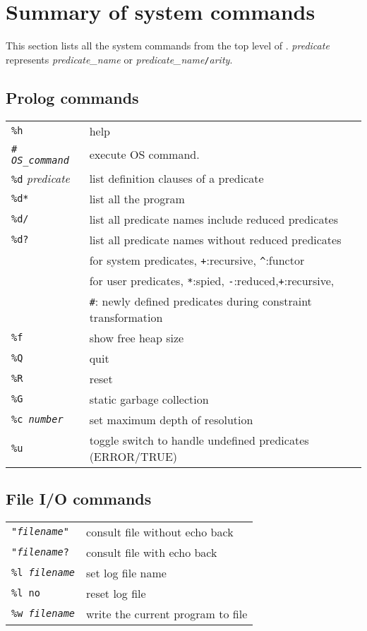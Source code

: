 \section{Summary of system commands}
This section lists all the system commands from the top level of
\cuprolog. 
{\em predicate} represents {\em predicate\_name} or {\em
predicate\_name}{\tt /}{\em arity}. 

\subsection{Prolog commands}
\begin{tabular}{ll}
{\tt \%h}&	help	\\
{\tt \# {\em OS\_command}} & execute OS command.	\\
{\tt \%d} {\em predicate}	& list definition clauses of a predicate \\
{\tt \%d*} &	list all the program\\
{\tt \%d/} &  list all predicate names include reduced predicates\\
{\tt \%d?} &  list all predicate names without reduced predicates\\
	   &  for system predicates, \verb-+-:recursive, \verb-^-:functor\\
	   &  for user predicates, \verb-*-:spied, \verb+-+:reduced,\verb-+-:recursive, \\
	& \hspace{2cm} \verb-#-: newly defined predicates during constraint transformation\\
{\tt \%f}	& show free heap size \\
{\tt \%Q}	& quit \cuprolog	\\
{\tt \%R}	& reset \cuprolog\\
{\tt \%G}	& static garbage collection\\
{\tt \%c {\em number}}	& set maximum depth of resolution\\
{\tt \%u}	& toggle switch to handle undefined predicates
(ERROR/TRUE)\\
\end{tabular}

\subsection{File I/O commands}
\begin{tabular}{ll}
{\tt "{\em filename}"} & consult file without echo back\\
{\tt "{\em filename}?}& consult file with echo back	\\
{\tt \%l {\em filename}}	& set log file name	\\
{\tt \%l no}		& reset log file	\\
{\tt \%w {\em filename}}	& write the current program to file\\
\end{tabular}

